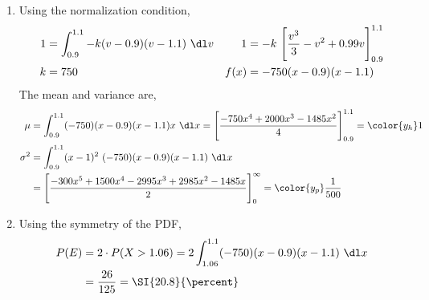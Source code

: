 \begin{enumerate}
    \item Using the normalization condition,
          \begin{align}
              1    & = \int_{0.9}^{1.1} -k(v-0.9)(v-1.1)\ \dl v                  &
              1    & = -k\ \Bigg[ \frac{v^3}{3} - v^2 + 0.99v \Bigg]_{0.9}^{1.1}   \\
              k    & = 750                                                       &
              f(x) & = -750(x-0.9)(x-1.1)
          \end{align}
          The mean and variance are,
          \begin{align}
              \mu      & = \int_{0.9}^{1.1} (-750)(x-0.9)(x-1.1)x\ \dl x
              = \Bigg[ \frac{-750x^4 + 2000x^3 - 1485x^2}{4} \Bigg]_{0.9}^{1.1}
              = \color{y_h} 1                                                      \\
              \sigma^2 & = \int_{0.9}^{1.1} (x - 1)^2\ (-750)(x-0.9)(x-1.1)\ \dl x \\
                       & = \Bigg[ \frac{-300x^5 + 1500x^4 - 2995x^3
                      + 2985x^2-1485x}{2} \Bigg]_{0}^{\infty}
              = \color{y_p} \frac{1}{500}
          \end{align}
          \begin{figure}[H]
              \centering
          \end{figure}

    \item Using the symmetry of the PDF,
          \begin{align}
              P(E) & = 2 \cdot P(X>1.06) =
              2\int_{1.06}^{1.1} (-750)(x-0.9)(x-1.1)\ \dl x \\
                   & = \frac{26}{125} = \SI{20.8}{\percent}
          \end{align}


\end{enumerate}
